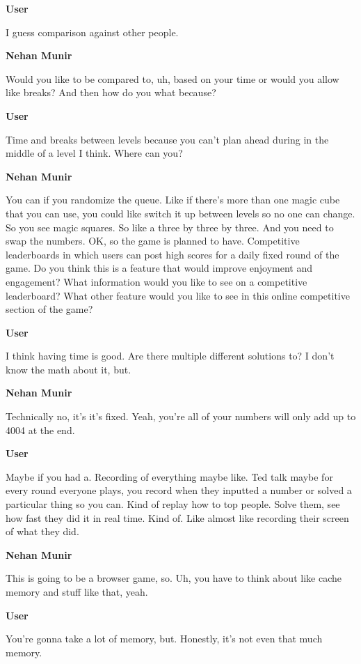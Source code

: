\documentclass{article}
\begin{document}
\noindent \textbf{User}

I guess comparison against other people.

\noindent \textbf{Nehan Munir}

Would you like to be compared to, uh, based on your time or would you allow like breaks? And then how do you what because?

\noindent \textbf{User}

Time and breaks between levels because you can't plan ahead during in the middle of a level I think. Where can you?

\noindent \textbf{Nehan Munir}

You can if you randomize the queue. Like if there's more than one magic cube that you can use, you could like switch it up between levels so no one can change. So you see magic squares. So like a three by three by three. And you need to swap the numbers. OK, so the game is planned to have. Competitive leaderboards in which users can post high scores for a daily fixed round of the game. Do you think this is a feature that would improve enjoyment and engagement? What information would you like to see on a competitive leaderboard? What other feature would you like to see in this online competitive section of the game?

\noindent \textbf{User}

I think having time is good. Are there multiple different solutions to? I don't know the math about it, but.

\noindent \textbf{Nehan Munir}

Technically no, it's it's fixed. Yeah, you're all of your numbers will only add up to 4004 at the end.

\noindent \textbf{User}

Maybe if you had a. Recording of everything maybe like. Ted talk maybe for every round everyone plays, you record when they inputted a number or solved a particular thing so you can. Kind of replay how to top people. Solve them, see how fast they did it in real time. Kind of. Like almost like recording their screen of what they did.

\noindent \textbf{Nehan Munir}

This is going to be a browser game, so. Uh, you have to think about like cache memory and stuff like that, yeah.

\noindent \textbf{User}

You're gonna take a lot of memory, but. Honestly, it's not even that much memory.
\end{document}
